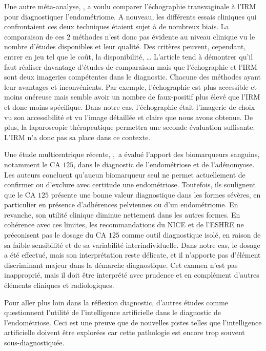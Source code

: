 Une autre méta-analyse, \textcite{kanti2024ultrasound}, a voulu comparer l’échographie transvaginale à l’IRM pour diagnostiquer l’endométriome. A nouveau, les différents essais cliniques qui confrontaient ces deux techniques étaient sujet à de nombreux biais. La comparaison de ces $2$ méthodes n’est donc pas évidente au niveau clinique vu le nombre d’études disponibles et leur qualité. Des critères peuvent, cependant, entrer en jeu tel que le coût, la disponibilité, \ldots{ } L’article tend à démontrer qu’il faut réaliser davantage d’études de comparaison mais que l’échographie et l’IRM sont deux imageries compétentes dans le diagnostic. Chacune des méthodes ayant leur avantages et inconvénients. Par exemple, l’échographie est plus accessible et moins onéreuse mais semble avoir un nombre de faux-positif plus élevé que l’IRM et donc moins spécifique. Dans notre cas, l’échographie était l’imagerie de choix vu son accessibilité et vu l’image détaillée et claire que nous avons obtenue. De plus, la laparoscopie thérapeutique permettra une seconde évaluation suffisante. L’IRM n’a donc pas sa place dans ce contexte.

Une étude multicentrique récente, \textcite{burghaus2024}\mbox{, }a évalué l’apport des biomarqueurs sanguins, notamment le CA $125$, dans le diagnostic de l’endométriose et de l’adénomyose. Les auteurs concluent qu’aucun biomarqueur seul ne permet actuellement de confirmer ou d’exclure avec certitude une endométriose. Toutefois, ils soulignent que le CA $125$ présente une bonne valeur diagnostique dans les formes sévères, en particulier en présence d’adhérences pelviennes ou d’un endométriome. En revanche, son utilité clinique diminue nettement dans les  autres formes. En cohérence avec ces limites, les recommandations du NICE et de l’ESHRE ne préconisent pas le dosage du CA $125$ comme outil diagnostique isolé, en raison de sa faible sensibilité et de sa variabilité interindividuelle. Dans notre cas, le dosage a été effectué, mais son interprétation reste délicate, et il n’apporte pas d’élément discriminant majeur dans la démarche diagnostique. Cet examen n’est pas inapproprié, mais il doit être interprété avec prudence et en complément d'autres éléments cliniques et radiologiques.

Pour aller plus loin dans la réflexion diagnostic, d’autres études comme \textcite{jiang2022diagnosis} questionnent l’utilité de l’intelligence artificielle dans le diagnostic de l’endométriose. Ceci est une preuve que de nouvelles pistes telles que l’intelligence artificielle doivent être explorées  car cette pathologie est encore trop souvent sous-diagnostiquée.

